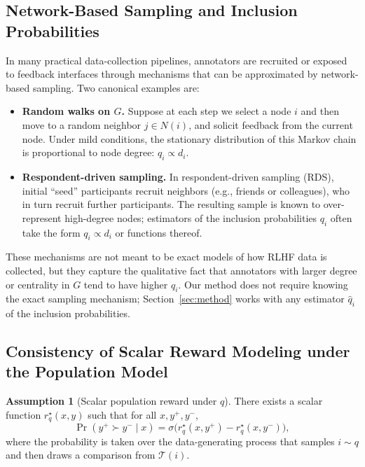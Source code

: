 \documentclass{article}
\theoremstyle{plain}
\theoremstyle{definition}
\newtheorem{assumption}[theorem]{Assumption}
\theoremstyle{remark}
\begin{document}
\subsection{Network-Based Sampling and Inclusion Probabilities}
\label{app:network-bias}

In many practical data-collection pipelines, annotators are recruited or
exposed to feedback interfaces through mechanisms that can be approximated by
network-based sampling. Two canonical examples are:

\begin{itemize}
    \item \textbf{Random walks on $G$.} Suppose at each step we select a node
    $i$ and then move to a random neighbor $j \in N(i)$, and solicit feedback
    from the current node. Under mild conditions, the stationary distribution
    of this Markov chain is proportional to node degree:
    $q_i \propto d_i$.
    \item \textbf{Respondent-driven sampling.} In respondent-driven sampling
    (RDS), initial ``seed'' participants recruit neighbors (e.g., friends or
    colleagues), who in turn recruit further participants. The resulting
    sample is known to over-represent high-degree nodes; estimators of the
    inclusion probabilities $q_i$ often take the form $q_i \propto d_i$ or
    functions thereof.
\end{itemize}

These mechanisms are not meant to be exact models of how RLHF data is
collected, but they capture the qualitative fact that annotators with larger
degree or centrality in $G$ tend to have higher $q_i$. Our method does not
require knowing the exact sampling mechanism; Section~\ref{sec:method} works
with any estimator $\hat q_i$ of the inclusion probabilities.

\subsection{Consistency of Scalar Reward Modeling under the Population Model}
\label{app:consistency}

\begin{assumption}[Scalar population reward under $q$]
\label{ass:scalar-q}
There exists a scalar function $r_q^\star(x,y)$ such that for all
$x,y^+,y^-$,
\begin{equation}
    \Pr(y^+ \succ y^- \mid x)
    =
    \sigma\!\big(r_q^\star(x,y^+) - r_q^\star(x,y^-)\big),
    \label{eq:scalar-q-reward}
\end{equation}
where the probability is taken over the data-generating process that samples
$i\sim q$ and then draws a comparison from $\mathcal{T}(i)$.
\end{assumption}
\end{document}
